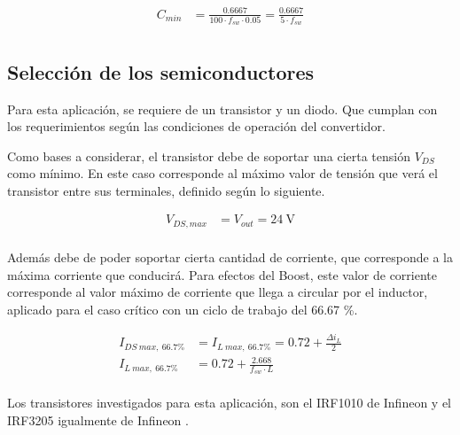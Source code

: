 \documentclass[conference]{IEEEtran}
\begin{document}
\begin{equation}
\begin{aligned}
    C_{min} &= \frac{0.6667}{100 \cdot f_{sw} \cdot 0.05} = \frac{0.6667}{5 \cdot f_{sw}} \\
\end{aligned}
\label{eq:capacitancia_minima_num}
\end{equation}


\subsection{Selección de los semiconductores}
Para esta aplicación, se requiere de un transistor y un diodo. Que cumplan con los requerimientos
según las condiciones de operación del convertidor.

Como bases a considerar, el transistor debe de soportar una cierta tensión $V_{DS}$ como mínimo. En
este caso corresponde al máximo valor de tensión que verá el transistor entre sus terminales, definido
según lo siguiente.

\begin{equation}
\begin{aligned}
    V_{DS,max} &= V_{out} = 24 ~\mathrm{V} \\
\end{aligned}
\label{eq:VDS_max}
\end{equation}

Además debe de poder soportar cierta cantidad de corriente, que corresponde a la máxima corriente que 
conducirá. Para efectos del Boost, este valor de corriente corresponde al valor máximo de corriente que
llega a circular por el inductor, aplicado para el caso crítico con un ciclo de trabajo del 66.67 \%.


\begin{equation}
\begin{aligned}
    I_{DS~max,~66.7 \%} &= I_{L~max,~66.7 \%} = 0.72 + \frac{\Delta i_{L}}{2} \\
            I_{L~max,~66.7 \%}  &= 0.72 + \frac{2.668}{f_{sw} \cdot L} \\
\end{aligned}
\label{eq:IL_max}
\end{equation}

Los transistores investigados para esta aplicación, son el IRF1010 de Infineon \cite{IRF1010EZ_Infineon} y el IRF3205 igualmente
de Infineon \cite{IRF3205_Infineon}.
\end{document}
